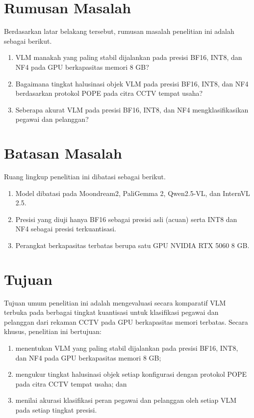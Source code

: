 \section{Rumusan Masalah}
Berdasarkan latar belakang tersebut, rumusan masalah penelitian ini adalah sebagai berikut.
\begin{enumerate} [topsep=0pt, itemsep=0pt, partopsep=0pt, parsep=0pt]
  \item VLM manakah yang paling stabil dijalankan pada presisi BF16, INT8, dan NF4 pada GPU berkapasitas memori 8 GB?
  \item Bagaimana tingkat halusinasi objek VLM pada presisi BF16, INT8, dan NF4 berdasarkan protokol POPE pada citra CCTV tempat usaha?
  \item Seberapa akurat VLM pada presisi BF16, INT8, dan NF4 mengklasifikasikan pegawai dan pelanggan?
\end{enumerate}

\section{Batasan Masalah}
Ruang lingkup penelitian ini dibatasi sebagai berikut.
\begin{enumerate} [topsep=0pt, itemsep=0pt, partopsep=0pt, parsep=0pt]
  \item Model dibatasi pada Moondream2, PaliGemma 2, Qwen2.5-VL, dan InternVL 2.5.
  \item Presisi yang diuji hanya BF16 sebagai presisi asli (acuan) serta INT8 dan NF4 sebagai presisi terkuantisasi.
  \item Perangkat berkapasitas terbatas berupa satu GPU NVIDIA RTX 5060 8 GB.\end{enumerate}

\newpage
\section{Tujuan}
Tujuan umum penelitian ini adalah mengevaluasi secara komparatif VLM terbuka pada berbagai tingkat kuantisasi untuk klasifikasi pegawai dan pelanggan dari rekaman CCTV pada GPU berkapasitas memori terbatas. Secara khusus, penelitian ini bertujuan:
\begin{enumerate} [topsep=0pt, itemsep=0pt, partopsep=0pt, parsep=0pt]
  \item menentukan VLM yang paling stabil dijalankan pada presisi BF16, INT8, dan NF4 pada GPU berkapasitas memori 8 GB;
  \item mengukur tingkat halusinasi objek setiap konfigurasi dengan protokol POPE pada citra CCTV tempat usaha; dan
  \item menilai akurasi klasifikasi peran pegawai dan pelanggan oleh setiap VLM pada setiap tingkat presisi.
\end{enumerate}


